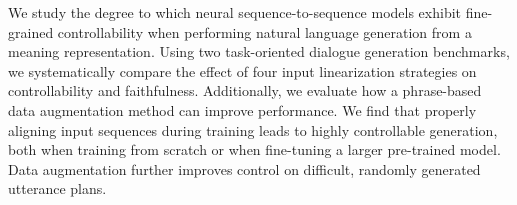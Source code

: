 We study the degree to which neural sequence-to-sequence models exhibit
fine-grained controllability when performing natural language generation from
a meaning representation.  Using two task-oriented dialogue generation
benchmarks, we systematically compare the effect of four input linearization
strategies on controllability and faithfulness.  Additionally, we evaluate how
a phrase-based data augmentation method can improve performance.  We find that
properly aligning input sequences during training leads to highly controllable
generation, both when training from scratch or when fine-tuning a larger
pre-trained model.  Data augmentation further improves control on difficult,
randomly generated utterance plans.
